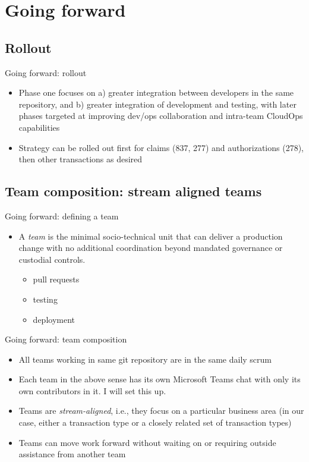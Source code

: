 \documentclass{beamer}
\begin{document}
	\section{Going forward}
	\subsection{Rollout}
	\begin{frame}{Going forward: rollout}
		\begin{itemize}
			\item Phase one focuses on a) greater integration between developers in the same repository, and b) greater integration of development and testing, with later phases targeted at improving dev/ops collaboration and intra-team CloudOps capabilities \pause
			\item Strategy can be rolled out first for claims (837, 277) and authorizations (278), then other transactions as desired \pause
		\end{itemize}
	\end{frame}
	\subsection{Team composition: stream aligned teams}
	\begin{frame}{Going forward: defining a team}
		\begin{itemize}
			\item A \textit{team} is the minimal socio-technical unit that can deliver a production change with no additional coordination beyond mandated governance or custodial controls. 
			\begin{itemize}
				\item pull requests 
				\item testing 
				\item deployment 
			\end{itemize}
		\end{itemize}
	\end{frame}
	\begin{frame}{Going forward: team composition}
		\begin{itemize}
			\item All teams working in same git repository are in the same daily scrum \pause
			\item Each team in the above sense has its own Microsoft Teams chat with only its own contributors in it. I will set this up. \pause
			\item Teams are \textit{stream-aligned}, i.e., they focus on a particular business area (in our case, either a transaction type or a closely related set of transaction types) \pause
			\item Teams can move work forward without waiting on or requiring outside assistance from another team \pause	
		\end{itemize}
	\end{frame}
\end{document}
